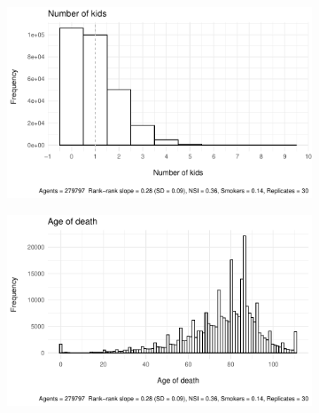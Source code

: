 \begin{figure}[htp]
    \caption{Population Dynamics (30 replicates)}\vspace{5mm}
    \label{ch04:population_verification}
     \centering
     \begin{subfigure}[b]{0.4\textwidth}
         \centering
         \includegraphics[width=\textwidth]{plots/verification/population/num_kids.pdf}
     \end{subfigure}
     \begin{subfigure}[b]{0.4\textwidth}
         \centering
         \includegraphics[width=\textwidth]{plots/verification/population/age_death.pdf}
     \end{subfigure}\vspace{5mm}


\end{figure}
